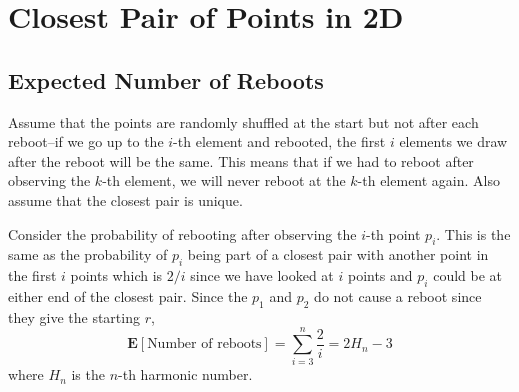 \section{Closest Pair of Points in 2D}

\subsection{Expected Number of Reboots}

Assume that the points are randomly shuffled at the start but not after each reboot--if we go up to the $i$-th element and rebooted, the first $i$ elements we draw after the reboot will be the same. This means that if we had to reboot after observing the $k$-th element, we will never reboot at the $k$-th element again. Also assume that the closest pair is unique.

Consider the probability of rebooting after observing the $i$-th point $p_i$. This is the same as the probability of $p_i$ being part of a closest pair with another point in the first $i$ points which is $2/i$ since we have looked at $i$ points and $p_i$ could be at either end of the closest pair. Since the $p_1$ and $p_2$ do not cause a reboot since they give the starting $r$,
\[
  \mathbf{E}[\text{Number of reboots}] = \sum_{i=3}^n \frac{2}{i} = 2H_n - 3
\]
where $H_n$ is the $n$-th harmonic number.
